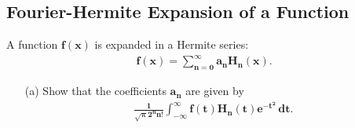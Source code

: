 \documentclass{article}
\begin{document}
{	\subsection*{Fourier-Hermite Expansion of a Function}
	A function $\bm{f(x)}$ is expanded in a Hermite series:
	\begin{equation*}
		\begin{split}
			\bm{f(x) = \sum_{n=0}^{\infty} a_n H_n(x).}
		\end{split}
	\end{equation*}
	\begin{enumerate}
		\item[(a)] Show that the coefficients $\bm{a_n}$ are given by
		\begin{equation*}
			\begin{split}
				\bm{\frac{1}{\sqrt{\pi} 2^n n!} \int_{-\infty}^{\infty} f(t) H_n(t) e^{-t^2} \, dt.}
			\end{split}
		\end{equation*}

\end{enumerate}}
\end{document}
